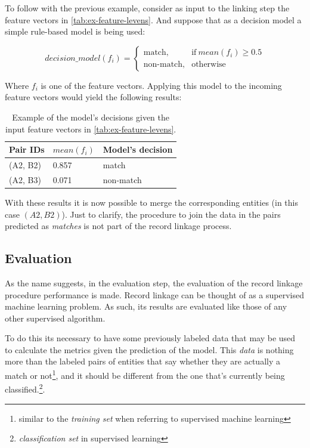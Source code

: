 \documentclass[epsfig,a4paper,11pt,titlepage,twoside,openany]{book}
\begin{document}
To follow with the previous example, consider as input to the linking step
the feature vectors in \autoref{tab:ex-feature-levens}. And suppose that as a
decision model a simple rule-based model is being used:

\begin{equation*}
  decision\_model(f_i) =
  \begin{cases}
    \text{match}, & \text{if}\ mean(f_i) \geq 0.5  \\
    \text{non-match}, & \text{otherwise}
  \end{cases}
\end{equation*}

Where $f_i$ is one of the feature vectors. Applying this model to the incoming
feature vectors would yield the following results:

\begin{table}[H]
  \centering
  \begin{tabular}{l|l|l}
    Pair IDs & $mean(f_i)$ & Model's decision \\ \hline
    (A2, B2) & 0.857       & match            \\
    (A2, B3) & 0.071       & non-match           
  \end{tabular}
  \caption{Example of the model's decisions given the input feature vectors in
    \autoref{tab:ex-feature-levens}.}
  \label{tab:ex-linking}
\end{table}

With these results it is now possible to merge the corresponding entities (in this case $(A2, B2)$). Just to clarify, the procedure to join the data in the pairs predicted as \textit{matches} is not part of the record linkage process.



\subsection{Evaluation}
\label{sec:rl-workflow-evaluation}

As the name suggests, in the evaluation step, the evaluation of the record linkage procedure performance is made. Record linkage can be thought of as a supervised machine learning problem. As such, its results are evaluated like those of any other supervised algorithm.

To do this its necessary to have some previously labeled data that may be used to calculate the metrics given the prediction of the model. This \textit{data} is nothing more than the labeled pairs of entities that say whether they are actually a match or not\footnote{similar to the \textit{training set} when referring to supervised machine learning}, and it should be different from the one that’s currently being classified.\footnote{\textit{classification set} in supervised learning}.
\end{document}
